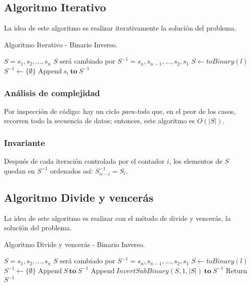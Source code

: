 \documentclass[letter]{article}
\begin{document}
\subsection{Algoritmo Iterativo} \label{iterativo}
La idea de este algoritmo es realizar iterativamente la solución del problema.
\begin{algorithm}[!htb]
\caption{Algoritmo Iterativo - Binario Inverso.}
\begin{algorithmic}[1]
\Require $S={s_1,s_2,...,s_n}$
\Ensure $S$ será cambiado por $S^{-1} ={s_n,s_{n-1},...,s_2,s_1}$
\State $S \leftarrow toBinary(l)$
\State $S^{-1} \leftarrow \{\emptyset\}$
    \State Append$~s_i~\mathbf{to}~S^{-1}$
  \EndFor
\EndProcedure
\end{algorithmic}
\end{algorithm}
\subsubsection{Análisis de complejidad} \label{algoritmos:iterativo:analisis}

Por inspección de código: hay un ciclo {\it para-todo} que, en el peor de los casos, recorren todo la secuencia de datos; entonces, este algoritmo es $O(|S|)$.

\subsubsection{Invariante} \label{algoritmos:iterativo:invariante}
Después de cada iteración controlada por el contador $i$, los elementos de $S$ quedan en $S^{-1}$ ordenados así: $S^{-1}_{n-i} = S_{i}$.
\subsection{Algoritmo Divide y vencerás} \label{divide}
La idea de este algoritmo es realizar con el método de divide y vencerás, la solución del problema.
\begin{algorithm}[!htb]
    \caption{Algoritmo Divide y vencerás - Binario Inverso.}
\begin{algorithmic}[1]
\Require $S={s_1,s_2,...,s_n}$
\Ensure $S$ será cambiado por $S^{-1} ={s_n,s_{n-1},...,s_2,s_1}$
\State $S \leftarrow toBinary(l)$
\State $S^{-1} \leftarrow \{\emptyset\}$
    \State Append$~S~\mathbf{to}~S^{-1}$
\EndIf
{}
    \State Append$~InvertSubBinary(S,1,|S|)~\mathbf{to}~S^{-1}$
\EndIf
\State Return $S^{-1}$
\EndProcedure
\end{algorithmic}
\end{algorithm} \newpage
\end{document}
